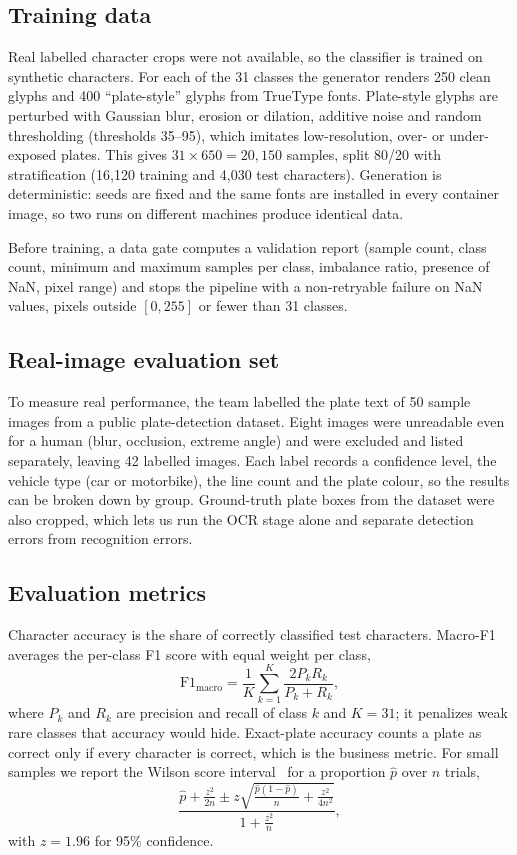 \documentclass[conference]{IEEEtran}
\begin{document}
\subsection{Training data}
Real labelled character crops were not available, so the classifier is trained on
synthetic characters. For each of the 31 classes the generator renders 250 clean
glyphs and 400 ``plate-style'' glyphs from TrueType fonts. Plate-style glyphs are
perturbed with Gaussian blur, erosion or dilation, additive noise and random
thresholding (thresholds 35--95), which imitates low-resolution, over- or
under-exposed plates. This gives $31 \times 650 = 20{,}150$ samples, split 80/20
with stratification (16{,}120 training and 4{,}030 test characters). Generation is
deterministic: seeds are fixed and the same fonts are installed in every
container image, so two runs on different machines produce identical data.

Before training, a data gate computes a validation report (sample count, class
count, minimum and maximum samples per class, imbalance ratio, presence of NaN,
pixel range) and stops the pipeline with a non-retryable failure on NaN values,
pixels outside $[0,255]$ or fewer than 31 classes.

\subsection{Real-image evaluation set}
To measure real performance, the team labelled the plate text of 50 sample
images from a public plate-detection dataset. Eight images were unreadable even
for a human (blur, occlusion, extreme angle) and were excluded and listed
separately, leaving 42 labelled images. Each label records a confidence level, the
vehicle type (car or motorbike), the line count and the plate colour, so the
results can be broken down by group. Ground-truth plate boxes from the dataset
were also cropped, which lets us run the OCR stage alone and separate detection
errors from recognition errors.

\subsection{Evaluation metrics}
Character accuracy is the share of correctly classified test characters. Macro-F1
averages the per-class F1 score with equal weight per class,
\begin{equation}
\text{F1}_{\text{macro}} = \frac{1}{K}\sum_{k=1}^{K} \frac{2 P_k R_k}{P_k + R_k},
\label{eq:f1}
\end{equation}
where $P_k$ and $R_k$ are precision and recall of class $k$ and $K=31$; it
penalizes weak rare classes that accuracy would hide. Exact-plate accuracy counts
a plate as correct only if every character is correct, which is the business
metric. For small samples we report the Wilson score interval~\cite{wilson1927}
for a proportion $\hat p$ over $n$ trials,
\begin{equation}
\frac{\hat p + \frac{z^2}{2n} \pm z\sqrt{\frac{\hat p(1-\hat p)}{n} + \frac{z^2}{4n^2}}}{1+\frac{z^2}{n}},
\label{eq:wilson}
\end{equation}
with $z=1.96$ for 95\% confidence.
\end{document}
